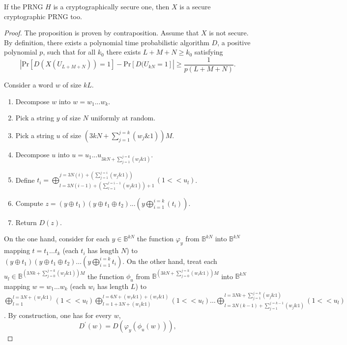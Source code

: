 \begin{proposition}
\label{cryptopreuve}
If the PRNG $H$ is a  cryptographically secure one, then $X$ is a secure cryptographic
PRNG too.
\end{proposition}

\begin{proof}
The proposition is proven by contraposition. Assume that $X$ is not
secure. By definition, there exists a polynomial time probabilistic
algorithm $D$, a positive polynomial $p$, such that for all $k_0$ there exists
$L+M+N\geq {k_0}$ satisfying 
$$| \mathrm{Pr}[D(X(U_{L+M+N}))=1]-\mathrm{Pr}[D(U_{kN}=1]|\geq \frac{1}{p(L+M+N)}.$$

Consider a word $w$ of size $kL$.
\begin{enumerate}
 \item Decompose $w$ into $w = w_1...w_k$.
 \item Pick a string $y$ of size $N$ uniformly at random.
 \item Pick a string $u$ of size $(3kN + \sum_{j=1}^{j=k}(w_j\&1)) M$.
 \item Decompose $u$ into $u = u_1...u_{3kN + \sum_{j=1}^{j=k}(w_j\&1)}$.
 \item Define $t_i = \bigoplus_{l=3N(i-1)+(\sum_{l=1}^{l=i-1}(w_j\&1))+1}^
 {j=3N(i)+(\sum_{j=1}^{j=i}(w_j\&1))}(1<<u_l)$.
 \item Compute $z = (y\oplus t_1) (y\oplus t_1 \oplus t_2) ... (y\bigoplus_{i=1}^{i=k}(t_i))$.
 \item Return $D(z)$.
\end{enumerate}


On the one hand, consider for each $y\in \mathbb{B}^{kN}$ the function $\varphi_{y}$ from $\mathbb{B}^{kN}$ into $\mathbb{B}^{kN}$ mapping $t=t_1\ldots t_k$ (each $t_i$ has length $N$) to $(y\oplus t_1 )(y\oplus t_1\oplus t_2)\ldots (y \bigoplus_{i=1}^{i=k} t_i)$.  On the other hand, treat each $u_l \in \mathbb{B}^{(3Nk + \sum_{j=0}^{j=k}(w_j\&1)) M}$ the function $\phi_{u}$ from $\mathbb{B}^{(3kN + \sum_{j=0}^{j=k}(w_i\&1)) M}$ into $\mathbb{B}^{kN}$ mapping $w = w_1 \ldots w_k$ (each $w_i$ has length $L$) to $\bigoplus_{l=1}^{l=3N+(w_1\&1)}(1<<u_l)  \bigoplus_{l=1+3N+(w_1\&1)}^{l=6N+(w_1\&1)+(w_1\&1)}(1<<u_l) \ldots \bigoplus_{l=3N(k-1)+\sum_{j=1}^{j=k-1}(w_j\&1)}^{l=3Nk+\sum_{j=1}^{j=k}(w_j\&1)}(1<<u_l)$. By construction, one has for every $w$,
\begin{equation}\label{PCH-1}
D^\prime(w)=D(\varphi_y(\phi_u(w))),
\end{equation}


\end{proof}
